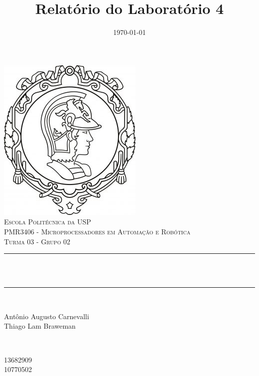\documentclass{article}
\title{Relatório do Laboratório 4}								%
\author{} %
\date{\today}											%
\makeatletter
\let\thetitle\@title
\let\thedate\@date
\makeatother
\begin{document}

\begin{titlepage}
	\centering
    \vspace*{0.2 cm}
    \includegraphics[scale = 0.8]{logoPoli.jpg}\\[1.0 cm]	%
    \textsc{\LARGE \newline\newline Escola Politécnica da USP}\\[1.5 cm]	%
    \textsc{\Large PMR3406 - Microprocessadores em Automação e Robótica}\\[0.5 cm] %
    \textsc{\Large Turma 03 - Grupo 02}\\[0.5 cm]
	
	\rule{\linewidth}{0.2 mm} \\[0.4 cm]
	{ \huge \bfseries \thetitle}\\ 
	\rule{\linewidth}{0.2 mm} \\[1 cm]
	
	\begin{minipage}{0.5\textwidth}
		\begin{flushleft} \large

                Antônio Augusto Carnevalli\\
                Thiago Lam Braweman\\
			
			\end{flushleft}
	\end{minipage}~
	\begin{minipage}{0.5\textwidth}
            
		\begin{flushright} \large
			
                13682909\\
                10770502\\
		    
		    \end{flushright}
        
	\end{minipage}\\~
	\vfill
	\thedate
	
    
\end{titlepage}
\end{document}
